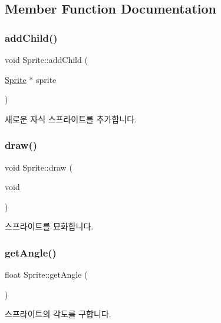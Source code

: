 \subsection{Member Function Documentation}
\mbox{\label{class_sprite_a62aef363da8c3a42e4eab4c3590b95a7}} 
\subsubsection{\texorpdfstring{addChild()}{addChild()}}
{\footnotesize\ttfamily void Sprite\+::add\+Child (\begin{DoxyParamCaption}\item[{\mbox{\hyperlink{class_sprite}{Sprite}} $\ast$}]{sprite }\end{DoxyParamCaption})}

새로운 자식 스프라이트를 추가합니다. \mbox{\label{class_sprite_a940292edd2ff28d2e8c60b840636f994}} 
\subsubsection{\texorpdfstring{draw()}{draw()}}
{\footnotesize\ttfamily void Sprite\+::draw (\begin{DoxyParamCaption}\item[{void}]{ }\end{DoxyParamCaption})\hspace{0.3cm}{\ttfamily [virtual]}}

스프라이트를 묘화합니다. \mbox{\label{class_sprite_a9c887ea9c0c44f7bc0ca9746e885ed31}} 
\subsubsection{\texorpdfstring{getAngle()}{getAngle()}}
{\footnotesize\ttfamily float Sprite\+::get\+Angle (\begin{DoxyParamCaption}{ }\end{DoxyParamCaption})}

스프라이트의 각도를 구합니다. \mbox{\label{class_sprite_a277d1623109b672a1ba5837603122bf1}} 
